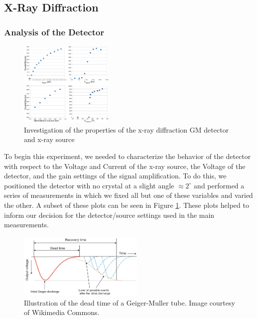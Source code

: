 \documentclass[%
 reprint,
 amsmath,amssymb,
 aps,
 pra,
]{revtex4-1}
\begin{document}
\subsection{X-Ray Diffraction}

\subsubsection{Analysis of the Detector}

\begin{figure}[H]
	\centering
	\includegraphics[width=0.4\textwidth]{xrd_setup_investigation.png}
	\caption{Investigation of the properties of the x-ray diffraction GM detector and x-ray source}
	\label{fig:xrf_setup_investigation}
\end{figure}

To begin this experiment, we needed to characterize the behavior of the detector with respect to the Voltage and Current of the x-ray source, the Voltage of the detector, and the gain settings of the signal amplification. To do this, we positioned the detector with no crystal at a slight angle $\approx 2^\circ$ and performed a series of measurements in which we fixed all but one of these variables and varied the other. A subset of these plots can be seen in Figure \ref{fig:xrf_setup_investigation}. These plots helped to inform our decision for the detector/source settings used in the main measurements.

\begin{figure}[H]
	\centering
	\includegraphics[width=6cm]{dead_time.png}
	\caption{Illustration of the dead time of a Geiger-Muller tube. Image courtesy of Wikimedia Commons.}
	\label{fig:dead_time}
\end{figure}
\end{document}
